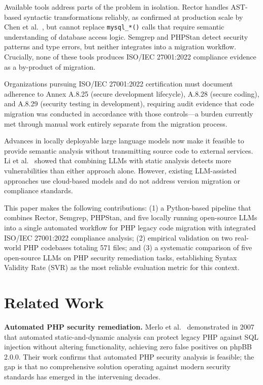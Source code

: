 \documentclass[conference]{IEEEtran}
\begin{document}
Available tools address parts of the problem in isolation.
Rector \cite{rector2024} handles AST-based syntactic
transformations reliably, as confirmed at production scale by
Chen et al.\ \cite{chen2022ast}, but cannot replace
\texttt{mysql\_*()} calls that require semantic understanding
of database access logic. Semgrep \cite{semgrep2024} and
PHPStan \cite{phpstan2024} detect security patterns and type
errors, but neither integrates into a migration workflow.
Crucially, none of these tools produces ISO/IEC 27001:2022
compliance evidence as a by-product of migration.

Organizations pursuing ISO/IEC 27001:2022 certification
\cite{iso27001_2022} must document adherence to Annex A.8.25
(secure development lifecycle), A.8.28 (secure coding), and
A.8.29 (security testing in development), requiring audit
evidence that code migration was conducted in accordance with
those controls---a burden currently met through manual work
entirely separate from the migration process.

Advances in locally deployable large language models
\cite{ollama2024} now make it feasible to provide semantic
analysis without transmitting source code to external services.
Li et al.\ \cite{li2025iris} showed that combining LLMs with
static analysis detects more vulnerabilities than either
approach alone. However, existing LLM-assisted approaches
\cite{akuthota2023vulnerability}\cite{stumpfle2025llm} use
cloud-based models and do not address version migration or
compliance standards.

This paper makes the following contributions: (1) a
Python-based pipeline that combines Rector, Semgrep, PHPStan,
and five locally running open-source LLMs into a single
automated workflow for PHP legacy code migration with integrated
ISO/IEC 27001:2022 compliance analysis; (2) empirical validation
on two real-world PHP codebases totaling 571 files; and (3) a
systematic comparison of five open-source LLMs on PHP security
remediation tasks, establishing Syntax Validity Rate (SVR) as
the most reliable evaluation metric for this context.

\section{Related Work}

\textbf{Automated PHP security remediation.}
Merlo et al.\ \cite{merlo2007automated} demonstrated in 2007
that automated static-and-dynamic analysis can protect legacy PHP
against SQL injection without altering functionality, achieving
zero false positives on phpBB 2.0.0. Their work confirms that
automated PHP security analysis is feasible; the gap is that no
comprehensive solution operating against modern security standards
has emerged in the intervening decades.
\end{document}
